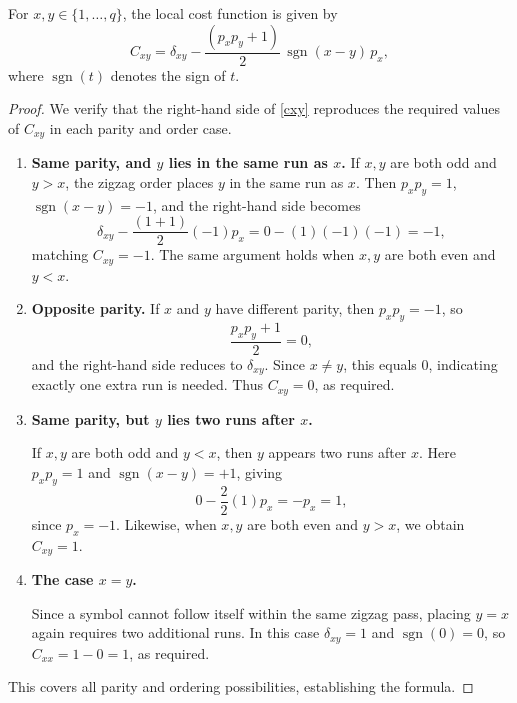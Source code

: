 \documentclass[10pt,a4paper]{amsart}
\begin{document}
\begin{lemma}
For $x,y\in\{1,\dots,q\}$, the local cost function is given by
\begin{equation}\label{cxy}
C_{xy}
   = \delta_{xy}
     -\frac{(p_x p_y + 1)}{2}\,
     \operatorname{sgn}(x-y)\,p_x,
\end{equation}
where $\operatorname{sgn}(t)$ denotes the sign of $t$.
\end{lemma}

\begin{proof}
We verify that the right-hand side of \eqref{cxy} reproduces the required values of
$C_{xy}$ in each parity and order case.
\begin{enumerate}
    \item \textbf{Same parity, and $y$ lies in the same run as $x$.}
\smallskip
If $x,y$ are both odd and $y>x$, the zigzag order places $y$ in the same run as $x$.
Then $p_x p_y = 1$, $\operatorname{sgn}(x-y) = -1$, and the right-hand side becomes
\[
\delta_{xy} - \frac{(1+1)}{2}(-1)p_x = 0 - (1)(-1)(-1)= -1,
\]
matching $C_{xy}=-1$.  
The same argument holds when $x,y$ are both even and $y<x$.

\item \textbf{Opposite parity.}
\smallskip
If $x$ and $y$ have different parity, then $p_x p_y = -1$, so
\[
\frac{p_x p_y + 1}{2} = 0,
\]
and the right-hand side reduces to $\delta_{xy}$.  
Since $x\neq y$, this equals $0$, indicating exactly one extra run is needed.  
Thus $C_{xy}=0$, as required.

\item \textbf{Same parity, but $y$ lies two runs after $x$.}

\smallskip
If $x,y$ are both odd and $y<x$, then $y$ appears two runs after $x$.  
Here $p_x p_y = 1$ and $\operatorname{sgn}(x-y)=+1$, giving
\[
0 - \frac{2}{2}(1)p_x = -p_x = 1,
\]
since $p_x=-1$.  
Likewise, when $x,y$ are both even and $y>x$, we obtain $C_{xy}=1$.

\item \textbf{The case $x=y$.}

\smallskip
Since a symbol cannot follow itself within the same zigzag pass, placing $y=x$ again
requires two additional runs.  
In this case $\delta_{xy}=1$ and $\operatorname{sgn}(0)=0$, so $C_{xx} = 1 - 0 = 1$, as required.
\end{enumerate}

\medskip
This covers all parity and ordering possibilities, establishing the formula.
\end{proof}
\end{document}
